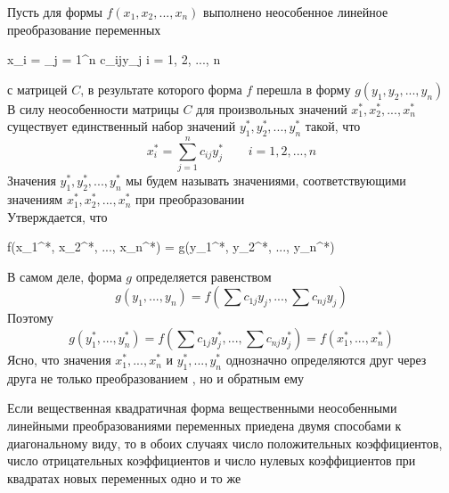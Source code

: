 \begin{remark}
	Пусть для формы $ f(x_1, x_2, ..., x_n) $ выполнено неособенное линейное преобразование переменных
	\begin{equ}{32}
		x_i = \sum_{j = 1}^n c_{ij}y_j \qquad i = 1, 2, ..., n
	\end{equ}
	с матрицей $ C $, в результате которого форма $ f $ перешла в форму $ g(y_1, y_2, ..., y_n) $ \\
	В силу неособенности матрицы $ C $ для произвольных значений $ x_1^*, x_2^*, ..., x_n^* $ существует единственный набор значений $ y_1^*, y_2^*, ..., y_n^* $ такой, что
	$$ x_i^* = \sum_{j = 1}^n c_{ij}y_j^* \qquad i = 1, 2, ..., n $$
	Значения $ y_1^*, y_2^*, ..., y_n^* $ мы будем называть значениями, соответствующими значениям $ x_1^*, x_2^*, ..., x_n^* $ при преобразовании  \\
	Утверждается, что
	\begin{equ}{33}
		f(x_1^*, x_2^*, ..., x_n^*) = g(y_1^*, y_2^*, ..., y_n^*)
	\end{equ}
	В самом деле, форма $ g $ определяется равенством
	$$ g(y_1, ..., y_n) = f(\sum c_{1j}y_j, ..., \sum c_{nj}y_j) $$
	Поэтому
	$$ g(y_1^*, ..., y_n^*) = f(\sum c_{1j}y_j^*, ..., \sum c_{nj}y_j^*) = f(x_1^*, ..., x_n^*) $$
	Ясно, что значения $ x_1^*, ..., x_n^* $ и $ y_1^*, ..., y_n^* $ однозначно определяются друг через друга не только преобразованием , но и обратным ему
\end{remark}

\begin{theorem}
	Если вещественная квадратичная форма вещественными неособенными линейными преобразованиями переменных приедена двумя способами к диагональному виду, то в обоих случаях число положительных коэффициентов, число отрицательных коэффициентов и число нулевых коэффициентов при квадратах новых переменных одно и то же
\end{theorem}

